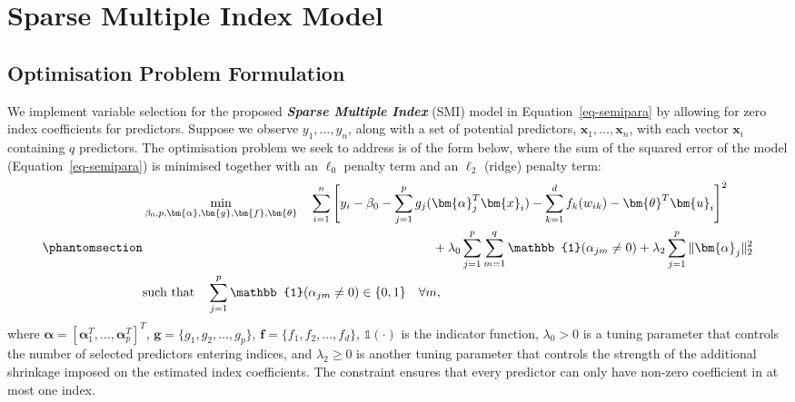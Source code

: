 \documentclass[
  11pt,
  a4paper,
]{report}
\begin{document}
\section{Sparse Multiple Index Model}\label{sec-SMI}

\subsection{Optimisation Problem
Formulation}\label{optimisation-problem-formulation}

We implement variable selection for the proposed \textbf{\emph{Sparse
Multiple Index}} (SMI) model in Equation~\ref{eq-semipara} by allowing
for zero index coefficients for predictors. Suppose we observe
\(y_1,\dots,y_n\), along with a set of potential predictors,
\(\bm{x}_1,\dots,\bm{x}_n\), with each vector \(\bm{x}_i\) containing
\(q\) predictors. The optimisation problem we seek to address is of the
form below, where the sum of the squared error of the model
(Equation~\ref{eq-semipara}) is minimised together with an \(\ell_{0}\)
penalty term and an \(\ell_{2}\) (ridge) penalty term:
\begin{equation}\phantomsection\label{eq-smi}{
\begin{aligned}
  & \min_{\beta_{0}, p, \bm{\alpha}, \bm{g}, \bm{f}, \bm{\theta}} \quad \sum_{i = 1}^{n}\Bigg [ y_{i} - \beta_{0} - \sum_{j = 1}^{p}g_{j}(\bm{\alpha}_{j}^{T}\bm{x}_{i}) - \sum_{k = 1}^{d}f_{k}(w_{ik}) - \bm{\theta}^{T}\bm{u}_{i}\Bigg]^{2}\\
  & \hspace*{8cm} + \lambda_{0}\sum_{j = 1}^{p}\sum_{m = 1}^{q}\mathbb{1}(\alpha_{jm} \neq 0) + \lambda_{2}\sum_{j = 1}^{p}\|\bm{\alpha}_{j}\|_2^2 \\
  & \text{such that}\quad \sum_{j=1}^p \mathbb{1}(\alpha_{jm} \neq 0) \in \{0,1\} \quad \forall m ,
\end{aligned}
}\end{equation} where
\(\bm{\alpha} = [\bm{\alpha}_{1}^{T}, \dots, \bm{\alpha}_{p}^{T} ]^{T}\),
\(\bm{g} = \{g_{1}, g_{2}, \dots, g_{p}\}\),
\(\bm{f} = \{f_{1}, f_{2}, \dots, f_{d}\}\), \(\mathbb{1}(\cdot)\) is
the indicator function, \(\lambda_{0} > 0\) is a tuning parameter that
controls the number of selected predictors entering indices, and
\(\lambda_{2} \ge 0\) is another tuning parameter that controls the
strength of the additional shrinkage imposed on the estimated index
coefficients. The constraint ensures that every predictor can only have
non-zero coefficient in at most one index.
\end{document}
